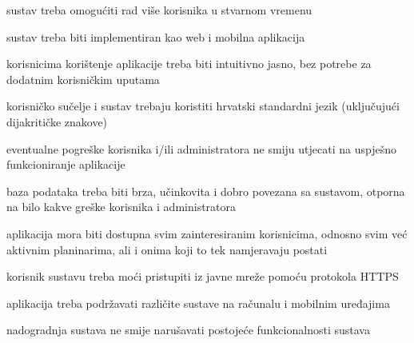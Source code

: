 		 
			 	\begin{packed_item}
			 	
			 	\item  $ $sustav treba omogućiti rad više korisnika u stvarnom vremenu $ $
			 	\item  $ $sustav treba biti implementiran kao web i mobilna aplikacija $ $
			 	\item  $ $korisnicima korištenje aplikacije treba biti intuitivno jasno, bez potrebe za dodatnim korisničkim uputama$ $
			 	\item  $ $korisničko sučelje i sustav trebaju koristiti hrvatski standardni jezik (uključujući dijakritičke znakove)$ $
			 	\item  $ $eventualne pogreške korisnika i/ili administratora ne smiju utjecati na uspješno funkcioniranje aplikacije$ $
			 	\item  $ $baza podataka treba biti brza, učinkovita i dobro povezana sa sustavom, otporna na bilo kakve greške korisnika i administratora$ $
			 	\item  $ $aplikacija mora biti dostupna svim zainteresiranim korisnicima, odnosno svim već aktivnim planinarima, ali i onima koji to tek namjeravaju postati$ $
			 	\item  $ $korisnik sustavu treba moći pristupiti iz javne mreže pomoću protokola HTTPS $ $
			 	\item  $ $aplikacija treba podržavati različite sustave na računalu i mobilnim uređajima$ $
			 	\item  $ $nadogradnja sustava ne smije narušavati postojeće funkcionalnosti sustava$ $
			 	
			 
			 \end{packed_item}
			 
			 
			 
	